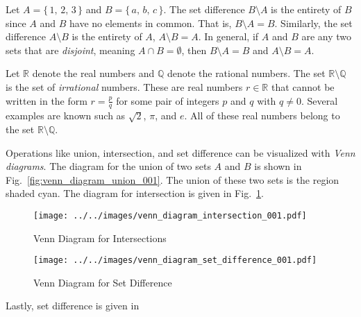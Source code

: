             \begin{example}
                Let $A=\{\,1,\,2,\,3\,\}$ and $B=\{\,a,\,b,\,c\,\}$. The set
                difference $B\setminus{A}$ is the entirety of $B$ since $A$ and
                $B$ have no elements in common. That is,
                $B\setminus{A}=B$. Similarly, the set difference $A\setminus{B}$
                is the entirety of $A$, $A\setminus{B}=A$. In general, if $A$
                and $B$ are any two sets that are \textit{disjoint}, meaning
                $A\cap{B}=\emptyset$, then $B\setminus{A}=B$ and
                $A\setminus{B}=A$.
            \end{example}
            \begin{example}
                Let $\mathbb{R}$ denote the real numbers and $\mathbb{Q}$ denote
                the rational numbers. The set $\mathbb{R}\setminus\mathbb{Q}$ is
                the set of \textit{irrational} numbers. These are real numbers
                $r\in\mathbb{R}$ that cannot be written in the form
                $r=\frac{p}{q}$ for some pair of integers $p$ and $q$ with
                $q\ne{0}$. Several examples are known such as
                $\sqrt{2}$, $\pi$, and $e$. All of these real numbers belong to
                the set $\mathbb{R}\setminus\mathbb{Q}$.
            \end{example}
            Operations like union, intersection, and set difference can be
            visualized with \textit{Venn diagrams}. The diagram for the union
            of two sets $A$ and $B$ is shown in
            Fig.~\ref{fig:venn_diagram_union_001}. The union of these two sets
            is the region shaded cyan. The diagram for intersection is given
            in Fig.~\ref{fig:venn_diagram_intersection_001}.
            \begin{figure}
                \centering
                \texttt{[image: ../../images/venn\_diagram\_intersection\_001.pdf]}
                \caption{Venn Diagram for Intersections}
                \label{fig:venn_diagram_intersection_001}
            \end{figure}
            \begin{figure}
                \centering
                \texttt{[image: ../../images/venn\_diagram\_set\_difference\_001.pdf]}
                \caption{Venn Diagram for Set Difference}
                \label{fig:venn_diagram_set_difference_001}
            \end{figure}
            Lastly, set difference is given in
